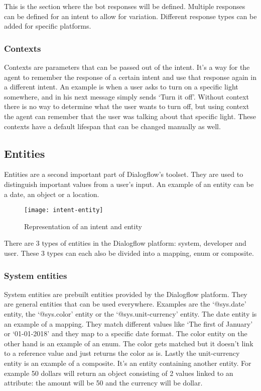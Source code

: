 This is the section where the bot responses will be defined. Multiple responses can be defined for an intent to allow for variation. Different response types can be added for specific platforms.

\subsubsection{Contexts}

Contexts are parameters that can be passed out of the intent. It's a way for the agent to remember the response of a certain intent and use that response again in a different intent. An example is when a user asks to turn on a specific light somewhere, and in his next message simply sends `Turn it off'. Without context there is no way to determine what the user wants to turn off, but using context the agent can remember that the user was talking about that specific light. These contexts have a default lifespan that can be changed manually as well.

\subsection{Entities}

Entities are a second important part of Dialogflow's toolset. They are used to distinguish important values from a user's input. An example of an entity can be a date, an object or a location.

\begin{figure}[ht]
	\centering
	\texttt{[image: intent-entity]}\label{fig:intent-entity}
	\caption{Representation of an intent and entity}
\end{figure}

There are 3 types of entities in the Dialogflow platform: system, developer and user. These 3 types can each also be divided into a mapping, enum or composite.

\subsubsection{System entities}

System entities are prebuilt entities provided by the Dialogflow platform. They are general entities that can be used everywhere. Examples are the `@sys.date' entity, the `@sys.color' entity or the `@sys.unit-currency' entity. The date entity is an example of a mapping. They match different values like `The first of January' or `01-01-2018' and they map to a specific date format. The color entity on the other hand is an example of an enum. The color gets matched but it doesn't link to a reference value and just returns the color as is. Lastly the unit-currency entity is an example of a composite. It's an entity containing another entity. For example 50 dollars will return an object consisting of 2 values linked to an attribute: the amount will be 50 and the currency will be dollar.


